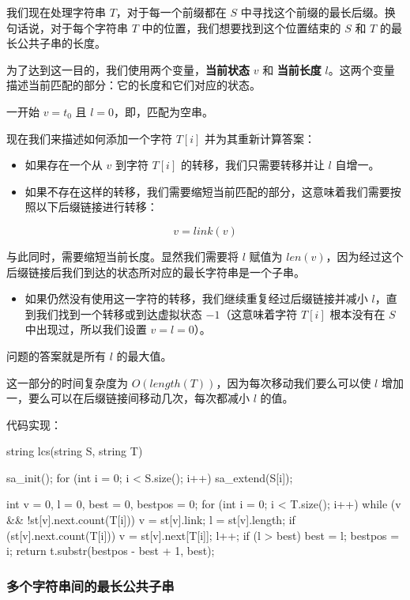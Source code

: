 我们现在处理字符串 $T$，对于每一个前缀都在 $S$ 中寻找这个前缀的最长后缀。换句话说，对于每个字符串 $T$ 中的位置，我们想要找到这个位置结束的 $S$ 和 $T$ 的最长公共子串的长度。

为了达到这一目的，我们使用两个变量，\textbf{当前状态} $v$ 和 \textbf{当前长度} $l$。这两个变量描述当前匹配的部分：它的长度和它们对应的状态。

一开始 $v=t_0$ 且 $l=0$，即，匹配为空串。

现在我们来描述如何添加一个字符 $T[i]$ 并为其重新计算答案：

\begin{itemize}
\item 如果存在一个从 $v$ 到字符 $T[i]$ 的转移，我们只需要转移并让 $l$ 自增一。
\item 如果不存在这样的转移，我们需要缩短当前匹配的部分，这意味着我们需要按照以下后缀链接进行转移：  
\end{itemize}

$$
v=link(v)
$$

   与此同时，需要缩短当前长度。显然我们需要将 $l$ 赋值为 $len(v)$，因为经过这个后缀链接后我们到达的状态所对应的最长字符串是一个子串。

\begin{itemize}
\item 如果仍然没有使用这一字符的转移，我们继续重复经过后缀链接并减小 $l$，直到我们找到一个转移或到达虚拟状态 $-1$（这意味着字符 $T[i]$ 根本没有在 $S$ 中出现过，所以我们设置 $v=l=0$）。
\end{itemize}

问题的答案就是所有 $l$ 的最大值。

这一部分的时间复杂度为 $O(length(T))$，因为每次移动我们要么可以使 $l$ 增加一，要么可以在后缀链接间移动几次，每次都减小 $l$ 的值。

代码实现：

\begin{cppcode}
string lcs(string S, string T) {
  sa_init();
  for (int i = 0; i < S.size(); i++) sa_extend(S[i]);

  int v = 0, l = 0, best = 0, bestpos = 0;
  for (int i = 0; i < T.size(); i++) {
    while (v && !st[v].next.count(T[i])) {
      v = st[v].link;
      l = st[v].length;
    }
    if (st[v].next.count(T[i])) {
      v = st[v].next[T[i]];
      l++;
    }
    if (l > best) {
      best = l;
      bestpos = i;
    }
  }
  return t.substr(bestpos - best + 1, best);
}
\end{cppcode}

\subsubsection{多个字符串间的最长公共子串}

